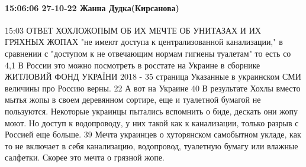 \paragraph{15:06:06 27-10-22 Жанна Дудка(Кирсанова)}
15:03
ОТВЕТ ХОХЛОЖОПЫМ ОБ ИХ МЕЧТЕ ОБ УНИТАЗАХ И ИХ ГРЯХНЫХ ЖОПАХ
"не имеют доступа к централизованной канализации," в сравнении с "доступом к не отвечающим нормам гигиены туалетам" то есть со 4,1%
В России это можно посмотреть в росстате на Украине в сборнике ЖИТЛОВИЙ ФОНД УКРАЇНИ 2018 - 35 страница
Указанные в украинском СМИ величины про Россию верны. 22%
А вот на Украине 40%
В результате Хохлы вместо мытья жопы в своем деревянном сортире, еще и туалетной бумагой не пользуются.
Некоторые украинцы пытались вспомнить о биде, дескать они жопу моют. Но доступ к водопроводу, у них такой как к канализации, только разрыв с Россией еще больше. 39%
Мечта украинцев о хуторянском самобытном укладе, как то не включает в себя канализацию, водопровод, туалетную бумагу или влажные салфетки. Скорее это мечта о грязной жопе.
